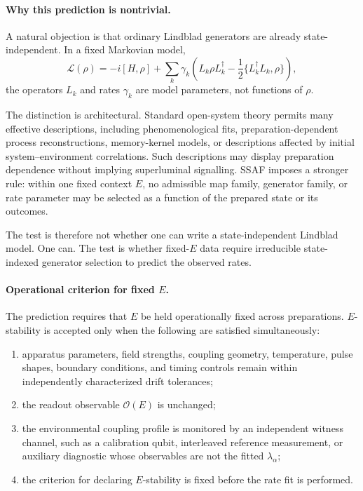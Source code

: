 \documentclass[aps,prx,onecolumn,11pt]{revtex4-2}
\theoremstyle{plain}
\theoremstyle{definition}
\theoremstyle{remark}
\begin{document}
\paragraph{Why this prediction is nontrivial.}

A natural objection is that ordinary Lindblad generators are already
state-independent. In a fixed Markovian model,
\[
\mathcal L(\rho)
=
-i[H,\rho]
+
\sum_k \gamma_k
\left(
L_k\rho L_k^\dagger
-\frac12\{L_k^\dagger L_k,\rho\}
\right),
\]
the operators \(L_k\) and rates \(\gamma_k\) are model parameters, not
functions of \(\rho\).

The distinction is architectural. Standard open-system theory permits
many effective descriptions, including phenomenological fits,
preparation-dependent process reconstructions, memory-kernel models,
or descriptions affected by initial system--environment correlations.
Such descriptions may display preparation dependence without implying
superluminal signalling. SSAF imposes a stronger rule: within one
fixed context \(E\), no admissible map family, generator family, or
rate parameter may be selected as a function of the prepared state or
its outcomes.

The test is therefore not whether one can write a state-independent
Lindblad model. One can. The test is whether fixed-\(E\) data require
irreducible state-indexed generator selection to predict the observed
rates.

\paragraph{Operational criterion for fixed \(E\).}

The prediction requires that \(E\) be held operationally fixed across
preparations. \(E\)-stability is accepted only when the following are
satisfied simultaneously:

\begin{enumerate}[label=(\roman*), leftmargin=2.2em]
\item apparatus parameters, field strengths, coupling geometry,
temperature, pulse shapes, boundary conditions, and timing controls
remain within independently characterized drift tolerances;
\item the readout observable \(\mathcal O(E)\) is unchanged;
\item the environmental coupling profile is monitored by an
independent witness channel, such as a calibration qubit, interleaved
reference measurement, or auxiliary diagnostic whose observables are
not the fitted \(\lambda_\alpha\);
\item the criterion for declaring \(E\)-stability is fixed before the
rate fit is performed.
\end{enumerate}
\end{document}
